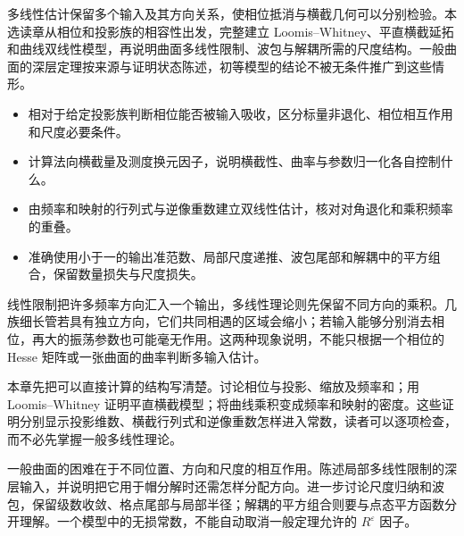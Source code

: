 \begin{chapterabstract}
多线性估计保留多个输入及其方向关系，使相位抵消与横截几何可以分别检验。本选读章从相位和投影族的相容性出发，完整建立 Loomis--Whitney、平直横截延拓和曲线双线性模型，再说明曲面多线性限制、波包与解耦所需的尺度结构。一般曲面的深层定理按来源与证明状态陈述，初等模型的结论不被无条件推广到这些情形。
\end{chapterabstract}

\begin{learninggoals}\begin{itemize}
\item\label{b2:item:25-goal-1}相对于给定投影族判断相位能否被输入吸收，区分标量非退化、相位相互作用和尺度必要条件。
\item\label{b2:item:25-goal-2}计算法向横截量及测度换元因子，说明横截性、曲率与参数归一化各自控制什么。
\item\label{b2:item:25-goal-3}由频率和映射的行列式与逆像重数建立双线性估计，核对对角退化和乘积频率的重叠。
\item\label{b2:item:25-goal-4}准确使用小于一的输出准范数、局部尺度递推、波包尾部和解耦中的平方组合，保留数量损失与尺度损失。
\end{itemize}\end{learninggoals}

线性限制把许多频率方向汇入一个输出，多线性理论则先保留不同方向的乘积。几族细长管若具有独立方向，它们共同相遇的区域会缩小；若输入能够分别消去相位，再大的振荡参数也可能毫无作用。这两种现象说明，不能只根据一个相位的 Hesse 矩阵或一张曲面的曲率判断多输入估计。

\ProseParagraphBreak

本章先把可以直接计算的结构写清楚。讨论相位与投影、缩放及频率和；用 Loomis--Whitney 证明平直横截模型；将曲线乘积变成频率和映射的密度。这些证明分别显示投影维数、横截行列式和逆像重数怎样进入常数，读者可以逐项检查，而不必先掌握一般多线性理论。

\ProseParagraphBreak

一般曲面的困难在于不同位置、方向和尺度的相互作用。陈述局部多线性限制的深层输入，并说明把它用于帽分解时还需怎样分配方向。进一步讨论尺度归纳和波包，保留级数收敛、格点尾部与局部半径；解耦的平方组合则要与点态平方函数分开理解。一个模型中的无损常数，不能自动取消一般定理允许的 \(R^\varepsilon\) 因子。

